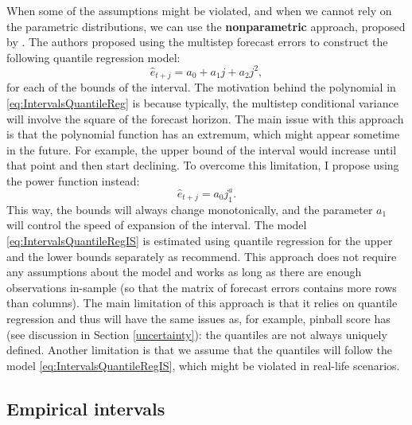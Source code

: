 \documentclass[]{book}
\theoremstyle{definition}
\theoremstyle{definition}
\theoremstyle{definition}
\theoremstyle{definition}
\theoremstyle{remark}
\begin{document}
When some of the assumptions might be violated, and when we cannot rely on the parametric distributions, we can use the \textbf{nonparametric} approach, proposed by \citet{Taylor1999}. The authors proposed using the multistep forecast errors to construct the following quantile regression model:
\begin{equation}
    \hat{e}_{t+j} = a_0 + a_1 j + a_2 j^2,
    \label{eq:IntervalsQuantileReg}
\end{equation}
for each of the bounds of the interval. The motivation behind the polynomial in \eqref{eq:IntervalsQuantileReg} is because typically, the multistep conditional variance will involve the square of the forecast horizon. The main issue with this approach is that the polynomial function has an extremum, which might appear sometime in the future. For example, the upper bound of the interval would increase until that point and then start declining. To overcome this limitation, I propose using the power function instead:
\begin{equation}
    \hat{e}_{t+j} = a_0 j^a_1 .
    \label{eq:IntervalsQuantileRegIS}
\end{equation}
This way, the bounds will always change monotonically, and the parameter \(a_1\) will control the speed of expansion of the interval. The model \eqref{eq:IntervalsQuantileRegIS} is estimated using quantile regression for the upper and the lower bounds separately as \citet{Taylor1999} recommend. This approach does not require any assumptions about the model and works as long as there are enough observations in-sample (so that the matrix of forecast errors contains more rows than columns). The main limitation of this approach is that it relies on quantile regression and thus will have the same issues as, for example, pinball score has (see discussion in Section \ref{uncertainty}): the quantiles are not always uniquely defined. Another limitation is that we assume that the quantiles will follow the model \eqref{eq:IntervalsQuantileRegIS}, which might be violated in real-life scenarios.

\hypertarget{ADAMForecastingPIEmpirical}{%
\subsection{Empirical intervals}\label{ADAMForecastingPIEmpirical}}
\end{document}
